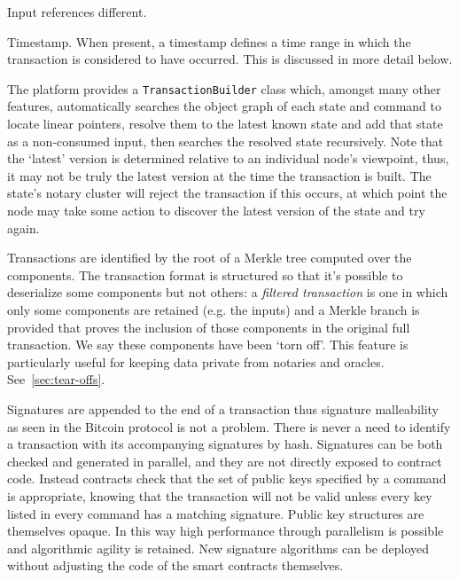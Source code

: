 \documentclass{article}
\begin{document}
\begin{labeling}{Input references}
different.
\item [Timestamp.] When present, a timestamp defines a time range in which the transaction is considered to
have occurred. This is discussed in more detail below.
\end{labeling}


The platform provides a \texttt{TransactionBuilder} class which, amongst many other features, automatically
searches the object graph of each state and command to locate linear pointers, resolve them to the latest known
state and add that state as a non-consumed input, then searches the resolved state recursively. Note that the `latest' version is determined relative to an
individual node's viewpoint, thus, it may not be truly the latest version at the time the transaction is built. The
state's notary cluster will reject the transaction if this occurs, at which point the node may take some action to
discover the latest version of the state and try again.

Transactions are identified by the root of a Merkle tree computed over the components. The transaction format is
structured so that it's possible to deserialize some components but not others: a \emph{filtered transaction} is
one in which only some components are retained (e.g. the inputs) and a Merkle branch is provided that proves the
inclusion of those components in the original full transaction. We say these components have been `torn off'. This
feature is particularly useful for keeping data private from notaries and oracles. See~\cref{sec:tear-offs}.

Signatures are appended to the end of a transaction thus signature malleability as seen in the Bitcoin protocol is
not a problem. There is never a need to identify a transaction with its accompanying signatures by hash. Signatures
can be both checked and generated in parallel, and they are not directly exposed to contract code. Instead
contracts check that the set of public keys specified by a command is appropriate, knowing that the transaction
will not be valid unless every key listed in every command has a matching signature. Public key structures are
themselves opaque. In this way high performance through parallelism is possible and algorithmic agility is
retained. New signature algorithms can be deployed without adjusting the code of the smart contracts themselves.
\end{document}
